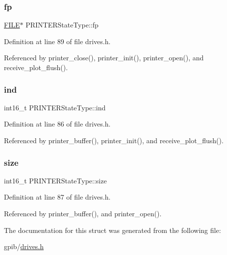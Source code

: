 \subsubsection{\texorpdfstring{fp}{fp}}
{\footnotesize\ttfamily \hyperlink{posix_8h_aed4dabeb9f7c518ded42f930a04abce8}{F\+I\+LE}$\ast$ P\+R\+I\+N\+T\+E\+R\+State\+Type\+::fp}



Definition at line 89 of file drives.\+h.



Referenced by printer\+\_\+close(), printer\+\_\+init(), printer\+\_\+open(), and receive\+\_\+plot\+\_\+flush().

\mbox{\label{structPRINTERStateType_a7d8873d0011f31d7dd00c2b7e0d362bd}} 
\subsubsection{\texorpdfstring{ind}{ind}}
{\footnotesize\ttfamily int16\+\_\+t P\+R\+I\+N\+T\+E\+R\+State\+Type\+::ind}



Definition at line 86 of file drives.\+h.



Referenced by printer\+\_\+buffer(), printer\+\_\+init(), and receive\+\_\+plot\+\_\+flush().

\mbox{\label{structPRINTERStateType_ac6d8323e47879ed58e7fa2cc7cfd7c30}} 
\subsubsection{\texorpdfstring{size}{size}}
{\footnotesize\ttfamily int16\+\_\+t P\+R\+I\+N\+T\+E\+R\+State\+Type\+::size}



Definition at line 87 of file drives.\+h.



Referenced by printer\+\_\+buffer(), and printer\+\_\+open().



The documentation for this struct was generated from the following file\+:\begin{DoxyCompactItemize}
\item 
gpib/\hyperlink{drives_8h}{drives.\+h}\end{DoxyCompactItemize}
